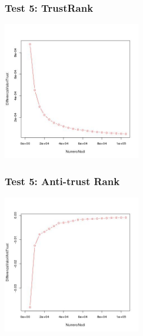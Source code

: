 \documentclass{beamer}
\begin{document}
\begin{frame}
\frametitle{Test 5: TrustRank}
\begin{center}
 \includegraphics[height=6cm]{immagini/test5/averageTest_trust_62}
\end{center}
\end{frame}
\begin{frame}
\frametitle{Test 5: Anti-trust Rank}
\begin{center}
 \includegraphics[height=6cm]{immagini/test5/averageTest_antitrust_62}
\end{center}
\end{frame}
\end{document}
